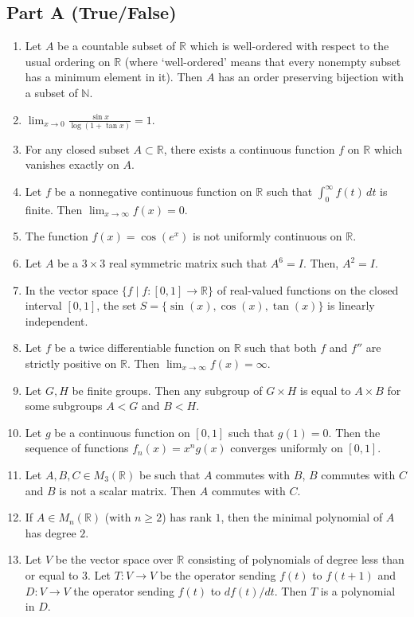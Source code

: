 \documentclass[11pt, a4paper]{article}
\begin{document}
\subsection*{Part A (True/False)}
\begin{enumerate}
  \item Let $A$ be a countable subset of $\mathbb{R}$ which is well-ordered with respect to the usual ordering on $\mathbb{R}$ (where `well-ordered' means that every nonempty subset has a minimum element in it). Then $A$ has an order preserving bijection with a subset of $\mathbb{N}$.
  \item $\displaystyle \lim_{x \to 0} \frac{\sin x}{\log(1 + \tan x)} = 1$.
  \item For any closed subset $A \subset \mathbb{R}$, there exists a continuous function $f$ on $\mathbb{R}$ which vanishes exactly on $A$.
  \item Let $f$ be a nonnegative continuous function on $\mathbb{R}$ such that $\int_0^\infty f(t)\,dt$ is finite. Then $\lim_{x \to \infty} f(x) = 0$.
  \item The function $f(x) = \cos(e^x)$ is not uniformly continuous on $\mathbb{R}$.
  \item Let $A$ be a $3 \times 3$ real symmetric matrix such that $A^6 = I$. Then, $A^2 = I$.
  \item In the vector space $\{f \mid f:[0,1] \to \mathbb{R}\}$ of real-valued functions on the closed interval $[0,1]$, the set $S = \{\sin(x), \cos(x), \tan(x)\}$ is linearly independent.
  \item Let $f$ be a twice differentiable function on $\mathbb{R}$ such that both $f$ and $f''$ are strictly positive on $\mathbb{R}$. Then $\lim_{x \to \infty} f(x) = \infty$.
  \item Let $G, H$ be finite groups. Then any subgroup of $G \times H$ is equal to $A \times B$ for some subgroups $A < G$ and $B < H$.
  \item Let $g$ be a continuous function on $[0,1]$ such that $g(1) = 0$. Then the sequence of functions $f_n(x) = x^n g(x)$ converges uniformly on $[0,1]$.
  \item Let $A, B, C \in M_3(\mathbb{R})$ be such that $A$ commutes with $B$, $B$ commutes with $C$ and $B$ is not a scalar matrix. Then $A$ commutes with $C$.
  \item If $A \in M_n(\mathbb{R})$ (with $n \ge 2$) has rank $1$, then the minimal polynomial of $A$ has degree $2$.
  \item Let $V$ be the vector space over $\mathbb{R}$ consisting of polynomials of degree less than or equal to $3$. Let $T: V \to V$ be the operator sending $f(t)$ to $f(t+1)$ and $D: V \to V$ the operator sending $f(t)$ to $df(t)/dt$. Then $T$ is a polynomial in $D$.

\end{enumerate}
\end{document}
